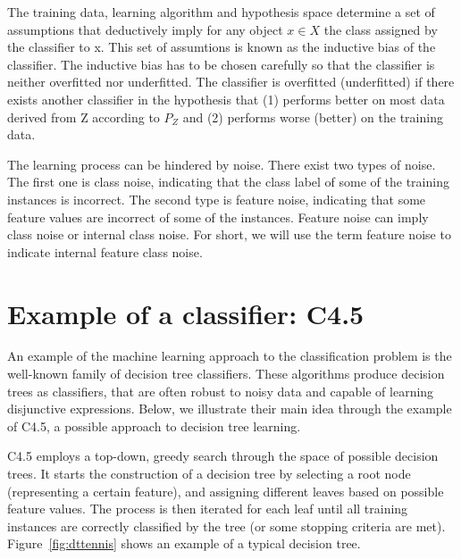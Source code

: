 The training data,  learning algorithm and  hypothesis space determine a set of assumptions that deductively imply for any object $x \in X$ the class assigned by the classifier to x. This set of assumtions is known as the inductive bias of the classifier. The inductive bias has to be chosen carefully so that the classifier is neither overfitted nor underfitted. The classifier is overfitted (underfitted) if there exists another classifier in the hypothesis that (1) performs better on most data derived from Z according to $P_Z$ and (2) performs worse (better) on the training data.

The learning process can be hindered by noise. There exist two types of noise. The first one is class noise, indicating that the class label of some of the training instances is incorrect. The second type is feature noise, indicating that  some feature values are incorrect of some of the instances. Feature noise can imply class noise or internal class noise. For short, we will use the term feature noise to indicate internal feature class noise.


\section{Example of a classifier: C4.5}\label{classifier-example}
An example of the machine learning approach to the classification problem is the well-known family of decision tree classifiers. These algorithms produce decision trees as classifiers, that are often robust to noisy data and capable of learning disjunctive expressions. Below, we illustrate their main idea through the example of C4.5, a possible approach to decision tree learning.

C4.5 employs a top-down, greedy search through the space of possible decision trees. It starts the construction of a decision tree by selecting a root node (representing a certain feature), and assigning different leaves based on possible feature values. The process is then iterated for each leaf until all training instances are correctly classified by the tree (or some stopping criteria are met). Figure~\ref{fig:dttennis} shows an example of a typical decision tree.


